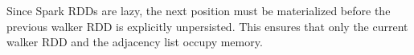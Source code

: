 Since Spark RDDs are lazy, the next position must be materialized before the previous walker RDD is explicitly unpersisted. This ensures that only the current walker RDD and the adjacency list occupy memory.



